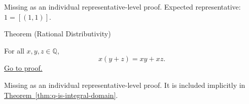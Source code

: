 \begin{remark*}[Status]
Missing as an individual representative-level proof. Expected representative: $1=[(1,1)]$.
\end{remark*}

\begin{theorembox}{Theorem (Rational Distributivity)}
\begin{theorem}
\label{thm:rational-distributivity}
For all $x,y,z\in\mathbb{Q}$,
\[
x(y+z)=xy+xz.
\]
\hyperref[prf:rational-distributivity]{Go to proof.}
\end{theorem}
\end{theorembox}

\begin{remark*}[Status]
Missing as an individual representative-level proof. It is included implicitly in \hyperref[thm:q-is-integral-domain]{Theorem~\ref*{thm:q-is-integral-domain}}.
\end{remark*}
